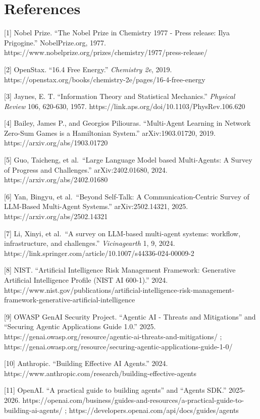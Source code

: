 \documentclass[
  11pt,
]{article}
\begin{document}
\section{References}\label{references}

{[}1{]} Nobel Prize. ``The Nobel Prize in Chemistry 1977 - Press
release: Ilya Prigogine.'' NobelPrize.org, 1977.
https://www.nobelprize.org/prizes/chemistry/1977/press-release/

{[}2{]} OpenStax. ``16.4 Free Energy.'' \emph{Chemistry 2e}, 2019.
https://openstax.org/books/chemistry-2e/pages/16-4-free-energy

{[}3{]} Jaynes, E. T. ``Information Theory and Statistical Mechanics.''
\emph{Physical Review} 106, 620-630, 1957.
https://link.aps.org/doi/10.1103/PhysRev.106.620

{[}4{]} Bailey, James P., and Georgios Piliouras. ``Multi-Agent Learning
in Network Zero-Sum Games is a Hamiltonian System.'' arXiv:1903.01720,
2019. https://arxiv.org/abs/1903.01720

{[}5{]} Guo, Taicheng, et al.~``Large Language Model based Multi-Agents:
A Survey of Progress and Challenges.'' arXiv:2402.01680, 2024.
https://arxiv.org/abs/2402.01680

{[}6{]} Yan, Bingyu, et al.~``Beyond Self-Talk: A Communication-Centric
Survey of LLM-Based Multi-Agent Systems.'' arXiv:2502.14321, 2025.
https://arxiv.org/abs/2502.14321

{[}7{]} Li, Xinyi, et al.~``A survey on LLM-based multi-agent systems:
workflow, infrastructure, and challenges.'' \emph{Vicinagearth} 1, 9,
2024. https://link.springer.com/article/10.1007/s44336-024-00009-2

{[}8{]} NIST. ``Artificial Intelligence Risk Management Framework:
Generative Artificial Intelligence Profile (NIST AI 600-1).'' 2024.
https://www.nist.gov/publications/artificial-intelligence-risk-management-framework-generative-artificial-intelligence

{[}9{]} OWASP GenAI Security Project. ``Agentic AI - Threats and
Mitigations'' and ``Securing Agentic Applications Guide 1.0.'' 2025.
https://genai.owasp.org/resource/agentic-ai-threats-and-mitigations/ ;
https://genai.owasp.org/resource/securing-agentic-applications-guide-1-0/

{[}10{]} Anthropic. ``Building Effective AI Agents.'' 2024.
https://www.anthropic.com/research/building-effective-agents

{[}11{]} OpenAI. ``A practical guide to building agents'' and ``Agents
SDK.'' 2025-2026.
https://openai.com/business/guides-and-resources/a-practical-guide-to-building-ai-agents/
; https://developers.openai.com/api/docs/guides/agents
\end{document}
